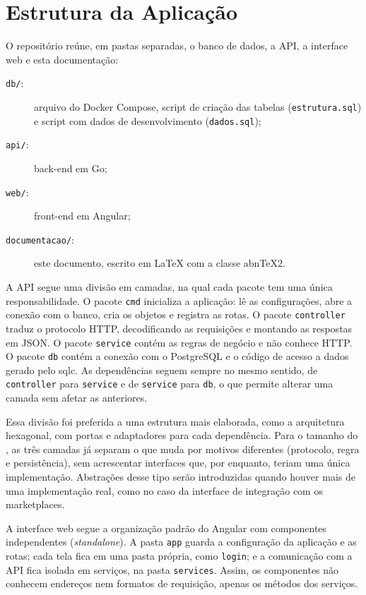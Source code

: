 \section{Estrutura da Aplicação}
\label{sec:estrutura}

O repositório reúne, em pastas separadas, o banco de dados, a API, a interface web e esta documentação:

\begin{description}
  \item[\texttt{db/}:] arquivo do Docker Compose, script de criação das tabelas (\texttt{estrutura.sql}) e script com dados de desenvolvimento (\texttt{dados.sql});
  \item[\texttt{api/}:] back-end em Go;
  \item[\texttt{web/}:] front-end em Angular;
  \item[\texttt{documentacao/}:] este documento, escrito em \LaTeX{} com a classe abnTeX2.
\end{description}

A API segue uma divisão em camadas, na qual cada pacote tem uma única responsabilidade. O pacote \texttt{cmd} inicializa a aplicação: lê as configurações, abre a conexão com o banco, cria os objetos e registra as rotas. O pacote \texttt{controller} traduz o protocolo HTTP, decodificando as requisições e montando as respostas em JSON. O pacote \texttt{service} contém as regras de negócio e não conhece HTTP. O pacote \texttt{db} contém a conexão com o PostgreSQL e o código de acesso a dados gerado pelo sqlc. As dependências seguem sempre no mesmo sentido, de \texttt{controller} para \texttt{service} e de \texttt{service} para \texttt{db}, o que permite alterar uma camada sem afetar as anteriores.

Essa divisão foi preferida a uma estrutura mais elaborada, como a arquitetura hexagonal, com portas e adaptadores para cada dependência. Para o tamanho do \sistema{}, as três camadas já separam o que muda por motivos diferentes (protocolo, regra e persistência), sem acrescentar interfaces que, por enquanto, teriam uma única implementação. Abstrações desse tipo serão introduzidas quando houver mais de uma implementação real, como no caso da interface de integração com os marketplaces.

A interface web segue a organização padrão do Angular com componentes independentes (\textit{standalone}). A pasta \texttt{app} guarda a configuração da aplicação e as rotas; cada tela fica em uma pasta própria, como \texttt{login}; e a comunicação com a API fica isolada em serviços, na pasta \texttt{services}. Assim, os componentes não conhecem endereços nem formatos de requisição, apenas os métodos dos serviços.

